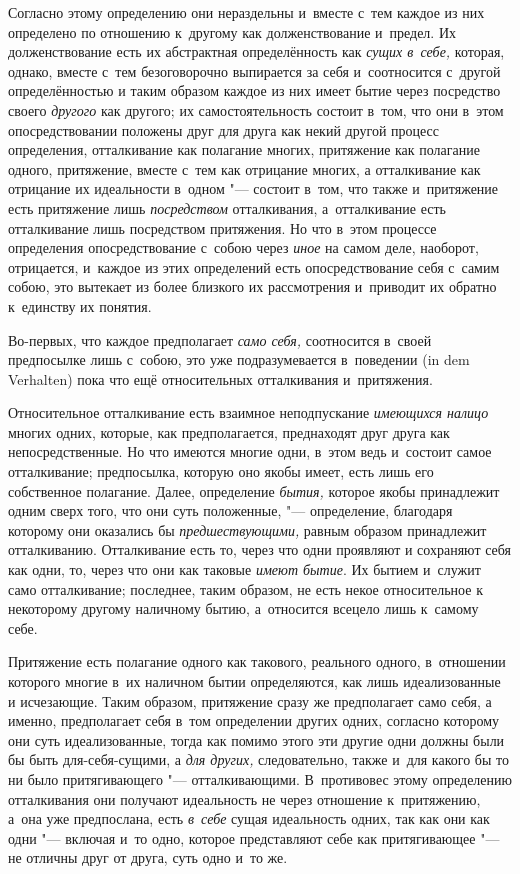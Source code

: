Согласно этому определению они нераздельны и~вместе с~тем каждое из них
определено по отношению к~другому как долженствование и~предел. Их
долженствование есть их абстрактная определённость как
{\em сущих в~себе,} которая, однако, вместе с~тем
безоговорочно выпирается за себя и~соотносится с~другой определённостью и
таким образом каждое из них имеет бытие через посредство своего
{\em другого} как другого; их самостоятельность состоит
в~том, что они в~этом опосредствовании положены друг для друга как некий
другой процесс определения, отталкивание как полагание многих, притяжение
как полагание одного, притяжение, вместе с~тем как отрицание многих, а
отталкивание как отрицание их идеальности в~одном "--- состоит в~том, что
также и~притяжение есть притяжение лишь
{\em посредством} отталкивания, а~отталкивание есть
отталкивание лишь посредством притяжения. Но что в~этом процессе
определения опосредствование с~собою через {\em иное}
на самом деле, наоборот, отрицается, и~каждое из этих определений есть
опосредствование себя с~самим собою, это вытекает из более близкого их
рассмотрения и~приводит их обратно к~единству их понятия.

Во-первых, что каждое предполагает {\em само себя,} соотносится в~своей
предпосылке лишь с~собою, это уже подразумевается в~поведении
(in dem Verhalten) пока что ещё относительных отталкивания и~притяжения.

Относительное отталкивание есть взаимное неподпускание
{\em имеющихся налицо} многих одних, которые, как
предполагается, преднаходят друг друга как непосредственные. Но что имеются
многие одни, в~этом ведь и~состоит самое отталкивание; предпосылка, которую
оно якобы имеет, есть лишь его собственное полагание. Далее, определение
{\em бытия,} которое якобы принадлежит одним сверх
того, что они суть положенные, "--- определение, благодаря которому они
оказались бы {\em предшествующими,} равным образом
принадлежит отталкиванию. Отталкивание есть то, через что одни проявляют и
сохраняют себя как одни, то, через что они как таковые
{\em имеют бытие}. Их бытием и~служит само
отталкивание; последнее, таким образом, не есть некое относительное к
некоторому другому наличному бытию, а~относится всецело лишь к~самому себе.

Притяжение есть полагание одного как такового, реального одного, в~отношении
которого многие в~их наличном бытии определяются, как лишь идеализованные и
исчезающие. Таким образом, притяжение сразу же предполагает само себя, а
именно, предполагает себя в~том определении других одних, согласно которому
они суть идеализованные, тогда как помимо этого эти другие одни должны были
бы быть для-себя-сущими, а {\em для других,}
следовательно, также и~для какого бы то ни было притягивающего
"--- отталкивающими. В~противовес этому определению отталкивания они получают
идеальность не через отношение к~притяжению, а~она уже предпослана, есть
{\em в~себе} сущая идеальность одних, так как они как одни "--- включая
и~то одно, которое представляют себе как притягивающее "--- не
отличны друг от друга, суть одно и~то же.

